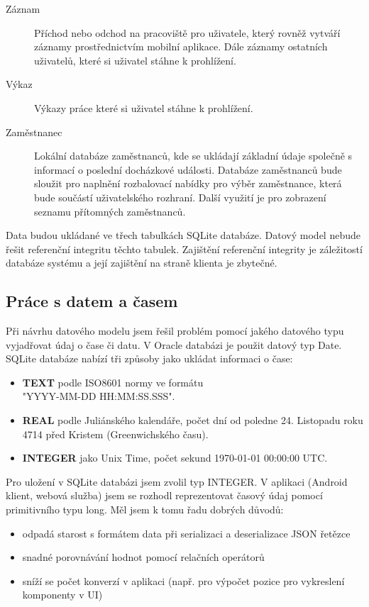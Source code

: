 \documentclass{diplomka}
\begin{document}
\begin{description}
\item [Záznam]
Příchod nebo odchod na pracoviště pro uživatele, který rovněž vytváří záznamy prostřednictvím mobilní aplikace. Dále záznamy ostatních uživatelů, které si uživatel stáhne k prohlížení.
\item [Výkaz]
Výkazy práce které si uživatel stáhne k prohlížení.
\item [Zaměstnanec] 
Lokální databáze zaměstnanců, kde se ukládají základní údaje společně s informací o poslední docházkové události. Databáze zaměstnanců bude sloužit pro naplnění rozbalovací nabídky pro výběr zaměstnance, která bude součástí uživatelského rozhraní.
Další využití je pro zobrazení seznamu přítomných zaměstnanců.
\end{description}

Data budou ukládané ve třech tabulkách SQLite databáze. Datový model nebude řešit referenční integritu těchto tabulek. Zajištění referenční integrity je záležitostí databáze systému a její zajištění na straně klienta je zbytečné.

\newpage
\subsection{Práce s datem a časem}
Při návrhu datového modelu jsem řešil problém pomocí jakého datového typu vyjadřovat údaj o čase či datu. V Oracle databázi je použit datový typ Date. SQLite databáze nabízí tři způsoby jako ukládat informaci o čase:
\begin{itemize}
\item \textbf{TEXT} podle ISO8601 normy ve formátu\\
"YYYY-MM-DD HH:MM:SS.SSS".
\item \textbf{REAL} podle Juliánského kalendáře, počet dní od poledne 24. Listopadu roku 4714 před Kristem (Greenwichského času).
\item \textbf{INTEGER} jako Unix Time, počet sekund 1970-01-01 00:00:00 UTC.
\end{itemize}

\noindent
Pro uložení v SQLite databázi jsem zvolil typ INTEGER. V aplikaci (Android klient, webová služba) jsem se rozhodl reprezentovat časový údaj pomocí primitivního typu long. Měl jsem k tomu řadu dobrých důvodů:
\begin{itemize}
\item odpadá starost s formátem data při serializaci a deserializace JSON řetězce
\item snadné porovnávání hodnot pomocí relačních operátorů
\item sníží se počet konverzí v aplikaci (např. pro výpočet pozice pro vykreslení komponenty v UI)
\end{itemize}
\end{document}
